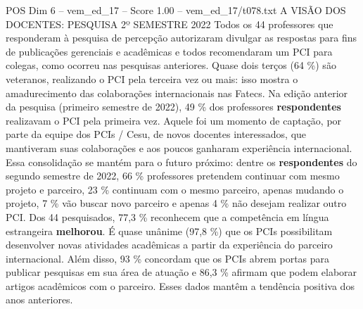 \begin{textsample}{POS Dim 6 – vem\_ed\_17 – Score 1.00 – vem\_ed\_17/t078.txt}  \label{ex:f6_pos_042}
A VISÃO DOS DOCENTES: PESQUISA 2º SEMESTRE 2022 Todos os 44 professores que responderam à pesquisa de percepção autorizaram divulgar as respostas para fins de publicações gerenciais e acadêmicas e todos recomendaram um PCI para colegas, como ocorreu nas pesquisas anteriores.
Quase dois terços (64 \%) são veteranos, realizando o PCI pela terceira vez ou mais: isso mostra o amadurecimento das colaborações internacionais nas Fatecs.
Na edição anterior da pesquisa (primeiro semestre de 2022), 49 \% dos professores \textbf{respondentes} realizavam o PCI pela primeira vez.
Aquele foi um momento de captação, por parte da equipe dos PCIs / Cesu, de novos docentes interessados, que mantiveram suas colaborações e aos poucos ganharam experiência internacional.
Essa consolidação se mantém para o futuro próximo: dentre os \textbf{respondentes} do segundo semestre de 2022, 66 \% professores pretendem continuar com mesmo projeto e parceiro, 23 \% continuam com o mesmo parceiro, apenas mudando o projeto, 7 \% vão buscar novo parceiro e apenas 4 \% não desejam realizar outro PCI.
Dos 44 pesquisados, 77,3 \% reconhecem que a competência em língua estrangeira \textbf{melhorou}.
É quase unânime (97,8 \%) que os PCIs possibilitam desenvolver novas atividades acadêmicas a partir da experiência do parceiro internacional.
Além disso, 93 \% concordam que os PCIs abrem portas para publicar pesquisas em sua área de atuação e 86,3 \% afirmam que podem elaborar artigos acadêmicos com o parceiro.
Esses dados mantêm a tendência positiva dos anos anteriores.

\end{textsample}
